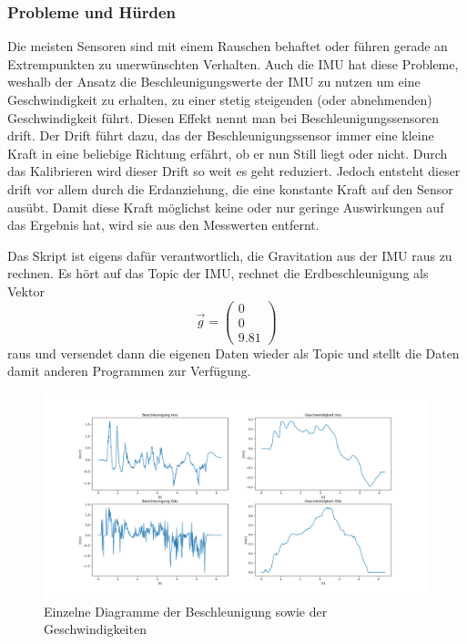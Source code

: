 \subsubsection{Probleme und Hürden}
\label{sec:imu-probleme}
Die meisten Sensoren sind mit einem Rauschen behaftet oder führen gerade an Extrempunkten zu unerwünschten Verhalten. Auch die IMU hat diese Probleme, weshalb der Ansatz die Beschleunigungswerte der IMU zu nutzen um eine Geschwindigkeit zu erhalten, zu einer stetig steigenden (oder abnehmenden) Geschwindigkeit führt. Diesen Effekt nennt man bei Beschleunigungssensoren drift. Der Drift führt dazu, das der Beschleunigungssensor immer eine kleine Kraft in eine beliebige Richtung erfährt, ob er nun Still liegt oder nicht. Durch das Kalibrieren wird dieser Drift so weit es geht reduziert. Jedoch entsteht dieser drift vor allem durch die Erdanziehung, die eine konstante Kraft auf den Sensor ausübt. Damit diese Kraft möglichst keine oder nur geringe Auswirkungen auf das Ergebnis hat, wird sie aus den Messwerten entfernt. 

Das  Skript ist eigens dafür verantwortlich, die Gravitation aus der IMU raus zu rechnen. Es hört auf das Topic der IMU, rechnet die Erdbeschleunigung als Vektor \begin{equation}
    \vec g = \left(\begin{array}{c} 0 \\ 0 \\ 9.81 \end{array}\right)
\end{equation}
raus und versendet dann die eigenen Daten wieder als Topic und stellt die Daten damit anderen Programmen zur Verfügung. 

\begin{figure}
    \centering
    \hspace*{-2cm}\includegraphics[width=1.25\linewidth]{bilder/23AprImuOdoBeschlGeschw.png}
    \caption{Einzelne Diagramme der Beschleunigung sowie der Geschwindigkeiten}
    \label{fig:diagramAprImuOdoBeschlGeschw}
\end{figure}

